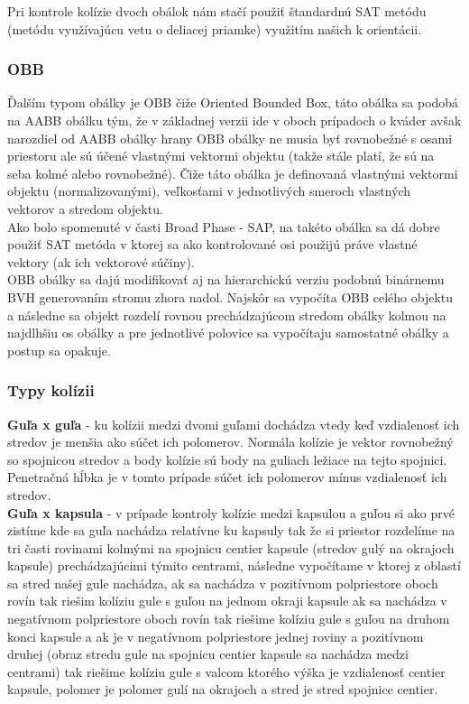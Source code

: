 \documentclass[a4paper]{article}
\begin{document}
	Pri kontrole kolízie dvoch obálok nám stačí použiť štandardnú SAT metódu (metódu využívajúcu vetu o deliacej priamke) využitím našich k orientácii.
	
	\subsubsection{OBB}
	
	Ďalším typom obálky je OBB čiže Oriented Bounded Box, táto obálka sa podobá na AABB obálku tým, že v základnej verzii ide v oboch prípadoch o kváder avšak narozdiel od AABB obálky hrany OBB obálky ne musia byť rovnobežné s osami priestoru ale sú účené vlastnými vektormi objektu (takže stále platí, že sú na seba kolmé alebo rovnobežné). Čiže táto obálka je definovaná vlastnými vektormi objektu (normalizovanými), veľkosťami v jednotlivých smeroch vlastných vektorov a stredom objektu.
	\\
	
	Ako bolo spomenuté v časti Broad Phase - SAP, na takéto obálka sa dá dobre použiť SAT metóda v ktorej sa ako kontrolované osi použijú práve vlastné vektory (ak ich vektorové súčiny). 
	\\
	
	OBB obálky sa dajú modifikovať aj na hierarchickú verziu podobnú binárnemu BVH generovaním stromu zhora nadol. Najskôr sa vypočíta OBB celého objektu a  následne sa objekt rozdelí rovnou prechádzajúcom stredom obálky kolmou na najdlhšiu os obálky a pre jednotlivé polovice sa vypočítaju samostatné obálky a postup sa opakuje.
	\\
	
	\subsubsection{Typy kolízii}
	
	\textbf{Guľa x guľa} -  ku kolízii medzi dvomi guľami dochádza vtedy keď vzdialenosť ich stredov je menšia ako súčet ich polomerov. Normála kolízie je vektor rovnobežný so spojnicou stredov a body kolízie sú body na guliach ležiace na tejto spojnici. Penetračná hĺbka je v tomto prípade súčet ich polomerov mínus vzdialenosť ich stredov.
	\\
	
	\textbf{Guľa x kapsula} -  v prípade kontroly kolízie medzi kapsulou a guľou si ako prvé zistíme kde sa guľa nachádza relatívne ku kapsuly tak že si priestor rozdelíme na tri časti rovinami kolmými na spojnicu centier kapsule (stredov gulý na okrajoch kapsule) prechádzajúcimi týmito centrami, následne vypočítame v ktorej z oblastí sa stred našej gule nachádza, ak sa nachádza v pozitívnom polpriestore oboch rovín tak riešim kolíziu gule s guľou na jednom okraji kapsule ak sa nachádza v negatívnom polpriestore oboch rovín tak riešime kolíziu gule s guľou na druhom konci kapsule a ak je v negatívnom polpriestore jednej roviny a pozitívnom druhej (obraz stredu gule na spojnicu centier kapsule sa nachádza medzi centrami) tak riešime kolíziu gule s valcom ktorého výška je vzdialenosť centier kapsule, polomer je polomer gulí na okrajoch a stred je stred spojnice centier.
	\\
	
\end{document}

